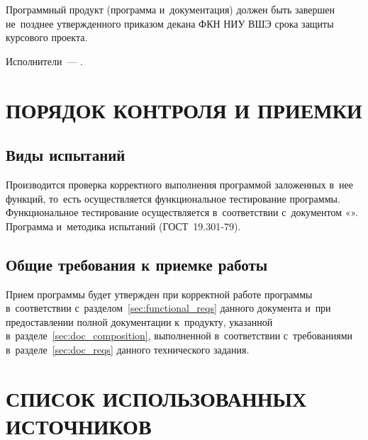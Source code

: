 \documentclass[12pt,a4paper]{extarticle}
\begin{document}
Программный продукт (программа и~документация) должен быть завершен не~позднее утвержденного приказом декана ФКН НИУ ВШЭ срока защиты курсового проекта.

Исполнители~--- \hseAuthorsList.

\clearpage

\section{ПОРЯДОК КОНТРОЛЯ И ПРИЕМКИ}

\subsection{Виды испытаний}

Производится проверка корректного выполнения программой заложенных в~нее функций, то~есть осуществляется функциональное тестирование программы. Функциональное тестирование осуществляется в~соответствии с~документом «\projectname». Программа и~методика испытаний (ГОСТ~19.301-79).

\subsection{Общие требования к приемке работы}

Прием программы будет утвержден при корректной работе программы в~соответствии с~разделом~\ref{sec:functional_reqs} данного документа и~при предоставлении полной документации к~продукту, указанной в~разделе~\ref{sec:doc_composition}, выполненной в~соответствии с~требованиями в~разделе~\ref{sec:doc_reqs} данного технического задания.

\clearpage
\pagestyle{appendix}

\section*{СПИСОК ИСПОЛЬЗОВАННЫХ ИСТОЧНИКОВ}
\end{document}
